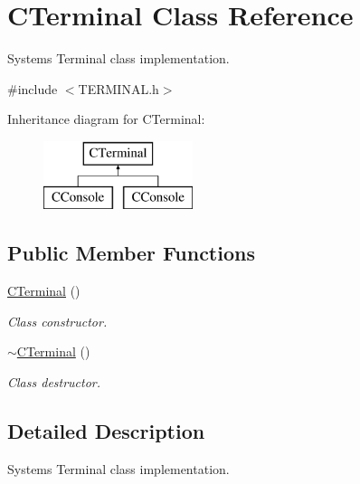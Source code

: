 \hypertarget{class_c_terminal}{}\section{C\+Terminal Class Reference}
\label{class_c_terminal}


System\textquotesingle{}s Terminal class implementation.  




{\ttfamily \#include $<$T\+E\+R\+M\+I\+N\+A\+L.\+h$>$}

Inheritance diagram for C\+Terminal\+:\begin{figure}[H]
\begin{center}
\leavevmode
\includegraphics[height=2.000000cm]{class_c_terminal}
\end{center}
\end{figure}
\subsection*{Public Member Functions}
\begin{DoxyCompactItemize}
\item 
\mbox{\label{class_c_terminal_a1dc0bbb40f1430d4e23ae079e86cace9}} 
\mbox{\hyperlink{class_c_terminal_a1dc0bbb40f1430d4e23ae079e86cace9}{C\+Terminal}} ()
\begin{DoxyCompactList}\small\item\em Class constructor. \end{DoxyCompactList}\item 
\mbox{\label{class_c_terminal_a3f56f1867a20c9d0b3c445be02eea571}} 
\mbox{\hyperlink{class_c_terminal_a3f56f1867a20c9d0b3c445be02eea571}{$\sim$\+C\+Terminal}} ()
\begin{DoxyCompactList}\small\item\em Class destructor. \end{DoxyCompactList}\end{DoxyCompactItemize}


\subsection{Detailed Description}
System\textquotesingle{}s Terminal class implementation. 

